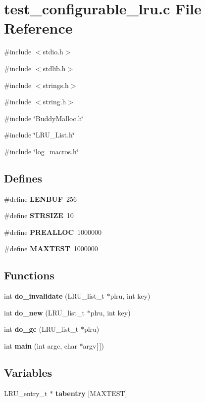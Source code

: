 \section{test\_\-configurable\_\-lru.c File Reference}
\label{test__configurable__lru_8c}
{\ttfamily \#include $<$stdio.h$>$}\par
{\ttfamily \#include $<$stdlib.h$>$}\par
{\ttfamily \#include $<$strings.h$>$}\par
{\ttfamily \#include $<$string.h$>$}\par
{\ttfamily \#include \char`\"{}BuddyMalloc.h\char`\"{}}\par
{\ttfamily \#include \char`\"{}LRU\_\-List.h\char`\"{}}\par
{\ttfamily \#include \char`\"{}log\_\-macros.h\char`\"{}}\par
\subsection*{Defines}
\begin{DoxyCompactItemize}
\item 
\#define {\bf LENBUF}~256
\item 
\#define {\bf STRSIZE}~10
\item 
\#define {\bf PREALLOC}~1000000
\item 
\#define {\bf MAXTEST}~1000000
\end{DoxyCompactItemize}
\subsection*{Functions}
\begin{DoxyCompactItemize}
\item 
int {\bf do\_\-invalidate} (LRU\_\-list\_\-t $\ast$plru, int key)
\item 
int {\bf do\_\-new} (LRU\_\-list\_\-t $\ast$plru, int key)
\item 
int {\bf do\_\-gc} (LRU\_\-list\_\-t $\ast$plru)
\item 
int {\bf main} (int argc, char $\ast$argv[$\,$])
\end{DoxyCompactItemize}
\subsection*{Variables}
\begin{DoxyCompactItemize}
\item 
LRU\_\-entry\_\-t $\ast$ {\bf tabentry} [MAXTEST]
\end{DoxyCompactItemize}


